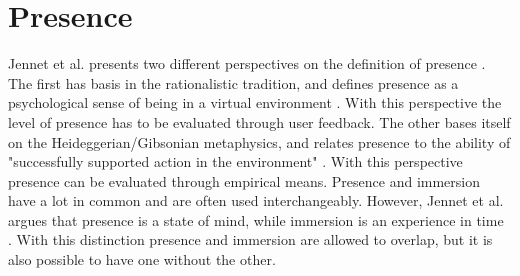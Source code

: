     \section{Presence} %
    Jennet et al. presents two different perspectives on the definition of presence \cite{JENNETT2008641}. The first has basis in the rationalistic tradition, and defines presence as a psychological sense of being in a virtual environment \cite{Slater1994}. With this perspective the level of presence has to be evaluated through user feedback. The other bases itself on the Heideggerian/Gibsonian metaphysics, and relates presence to the ability of "successfully supported action in the environment" \cite{Zahorik1998}. With this perspective presence can be evaluated through empirical means. Presence and immersion have a lot in common and are often used interchangeably. However, Jennet et al. argues that presence is a state of mind, while immersion is an experience in time \cite{JENNETT2008641}. With this distinction presence and immersion are allowed to overlap, but it is also possible to have one without the other.
    
